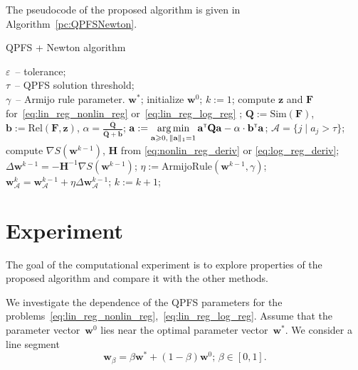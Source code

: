 \documentclass[a4paper,12pt]{article}
\renewcommand{\geq}{\ensuremath{\geqslant}}
\theoremstyle{plain} %
\theoremstyle{definition} %
\theoremstyle{remark} %
\newcommand{\ba}{\mathbf{a}}
\newcommand{\bb}{\mathbf{b}}
\newcommand{\bw}{\mathbf{w}}
\newcommand{\bz}{\mathbf{z}}
\newcommand{\cA}{\mathcal{A}}
\newcommand{\bQ}{\mathbf{Q}}
\newcommand{\bH}{\mathbf{H}}
\newcommand{\bF}{\mathbf{F}}
\newcommand{\T}{{\text{\tiny\sffamily\upshape\mdseries T}}}
\newcommand{\argmin}{\mathop{\arg \min}\limits}
\begin{document}
	The pseudocode of the proposed algorithm is given in Algorithm~\ref{pc:QPFSNewton}.
	\begin{algorithm}
		\caption{QPFS + Newton algorithm}
		\label{pc:QPFSNewton}
		\begin{algorithmic}
			\REQUIRE $\varepsilon$~-- tolerance;\\
			\hspace{1.53cm}$\tau$~-- QPFS solution threshold;\\
			\hspace{1.53cm}$\gamma$~-- Armijo rule parameter.
			\ENSURE $\bw^*$;
			\STATE  initialize $\bw^0$;
			\STATE $k := 1$;
			\REPEAT
			\STATE compute $\bz$ and $\bF$ for~\eqref{eq:lin_reg_nonlin_reg} or~\eqref{eq:lin_reg_log_reg} ;
			\vspace{0.1cm}
			\STATE $\bQ := \text{Sim} (\bF)$, $\bb := \text{Rel}(\bF, \bz)$, $\alpha = \frac{\overline{\bQ}}{\overline{\bQ} + \overline{\bb}}$;
			\vspace{0.1cm}
			\STATE $\ba := \argmin_{\ba \geq 0, \, \|\ba\|_1=1}\ba^{\T} \bQ \ba - \alpha \cdot \mathbf{b}^{\T} \ba$;
			\vspace{0.1cm}
			\STATE $\cA = \{j \mid a_j > \tau\}$;
			\vspace{0.1cm}
			\STATE compute $\nabla S(\bw^{k-1})$, $\bH$ from \eqref{eq:nonlin_reg_deriv} or \eqref{eq:log_reg_deriv};
			\vspace{0.1cm}
			\STATE $\Delta \bw^{k-1} = - \bH^{-1} \nabla S(\bw^{k-1})$;
			\vspace{0.1cm}
			\STATE $\eta := \text{ArmijoRule}(\bw^{k-1}, \gamma)$;
			\vspace{0.1cm}
			\STATE $\bw_{\cA}^k = \bw_{\cA}^{k - 1} + \eta \Delta \bw_{\cA}^{k - 1}$;
			\vspace{0.1cm}
			\STATE $k := k + 1$;
			\vspace{0.1cm}
			\UNTIL{$\frac{\| \bw^k - \bw^{k-1} \|}{\| \bw^k \|} < \varepsilon$}
		\end{algorithmic}
	\end{algorithm}
	
  	\section*{Experiment}
  	The goal of the computational experiment is to explore properties of the proposed algorithm and compare it with the other methods. 
  	
  	We investigate the dependence of the QPFS parameters for the problems~\eqref{eq:lin_reg_nonlin_reg},~\eqref{eq:lin_reg_log_reg}. 
  	Assume that the parameter vector~$\bw^0$ lies near the optimal parameter vector~$\bw^*$. 
  	We consider a line segment
  	\[
  	\bw_{\beta} = \beta \bw^* + (1 - \beta) \bw^0; \, \beta \in [0, 1] .
  	\]
  	
\end{document}
